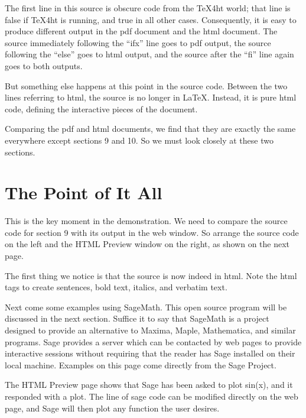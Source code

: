 \documentclass[11pt, oneside]{article}   	%
\begin{document}
The first line in this source is obscure code from the TeX4ht world; that line is false if TeX4ht is running, and true in all other cases. Consequently,  it is easy to produce different output in the pdf document and the html document.
The source immediately following the ``ifx'' line goes to  pdf output, the source following the ``else'' goes to  html output, and the source after the ``fi'' line again goes to both outputs.

But something else happens at this point in the source code. Between the two lines referring to html,
the source is no longer in LaTeX. Instead, it is pure html code, defining the interactive pieces of the document.


Comparing the pdf and html documents, we find that they are exactly the same everywhere except sections 9 and 10. So we must look closely at these two sections.

\section{The Point of It All}

This is the key moment in the demonstration. We need to compare the source code for section 9 with its output in the web window. So arrange the source code on the left and the HTML Preview window on the right, as shown on the next page.

The first thing we notice is that the source is now indeed in html. Note the html tags to create sentences, bold text, italics, and verbatim text.

Next come some examples using SageMath. This open source program will be discussed in the next section.
Suffice it to say that SageMath is a project designed to provide an alternative to Maxima, Maple, Mathematica, and similar programs. Sage provides a server which can be contacted by web pages to provide interactive sessions without requiring that the reader has Sage installed on their local machine. Examples on this page come directly from the Sage Project. 

The HTML Preview page shows that Sage has been asked to plot sin(x), and it responded with a plot. The line of sage code can be modified directly on the web page, and Sage will then plot any function the user desires.

\newpage
\end{document}
